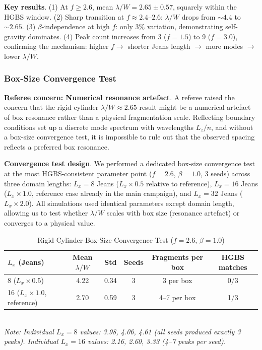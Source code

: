\documentclass[twocolumn,usenatbib]{mnras}
\begin{document}
\textbf{Key results}. (1) At $f \geq 2.6$, mean $\lambda/W = 2.65 \pm 0.57$, squarely within the HGBS window. (2) Sharp transition at $f \approx 2.4$--$2.6$: $\lambda/W$ drops from $\sim 4.4$ to $\sim 2.65$. (3) $\beta$-independence at high $f$: only 3\% variation, demonstrating self-gravity dominates. (4) Peak count increases from 3 ($f = 1.5$) to 9 ($f = 3.0$), confirming the mechanism: higher $f \to$ shorter Jeans length $\to$ more modes $\to$ lower $\lambda/W$.

\subsubsection{Box-Size Convergence Test}

\textbf{Referee concern: Numerical resonance artefact}. A referee raised the concern that the rigid cylinder $\lambda/W \approx 2.65$ result might be a numerical artefact of box resonance rather than a physical fragmentation scale. Reflecting boundary conditions set up a discrete mode spectrum with wavelengths $L_z/n$, and without a box-size convergence test, it is impossible to rule out that the observed spacing reflects a preferred box resonance.

\textbf{Convergence test design}. We performed a dedicated box-size convergence test at the most HGBS-consistent parameter point ($f = 2.6$, $\beta = 1.0$, 3 seeds) across three domain lengths: $L_x = 8$ Jeans ($L_x \times 0.5$ relative to reference), $L_x = 16$ Jeans ($L_x \times 1.0$, reference case already in the main campaign), and $L_x = 32$ Jeans ($L_x \times 2.0$). All simulations used identical parameters except domain length, allowing us to test whether $\lambda/W$ scales with box size (resonance artefact) or converges to a physical value.

\begin{table}[h]
\caption{Rigid Cylinder Box-Size Convergence Test ($f = 2.6$, $\beta = 1.0$)}
\label{tab:rc_convergence}
\begin{tabular}{lccccc}
\toprule
$L_x$ (Jeans) & Mean $\lambda/W$ & Std & Seeds & Fragments per box & HGBS matches \\
\midrule
8 ($L_x \times 0.5$) & 4.22 & 0.34 & 3 & 3 per box & 0/3 \\
16 ($L_x \times 1.0$, reference) & 2.70 & 0.59 & 3 & 4--7 per box & 1/3 \\
\bottomrule
\end{tabular}
\\
\footnotesize
\textit{Note: Individual $L_x = 8$ values: 3.98, 4.06, 4.61 (all seeds produced exactly 3 peaks). Individual $L_x = 16$ values: 2.16, 2.60, 3.33 (4--7 peaks per seed).}
\end{table}
\end{document}

